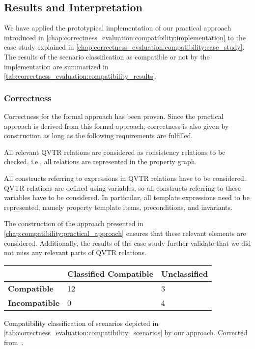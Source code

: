 \subsection{Results and Interpretation}

We have applied the prototypical implementation of our practical approach introduced in \autoref{chap:correctness_evaluation:compatibility:implementation} to the case study explained in \autoref{chap:correctness_evaluation:compatibility:case_study}.
The results of the scenario classification as compatible or not by the implementation are summarized in \autoref{tab:correctness_evaluation:compatibility_results}.

\subsubsection{Correctness}

Correctness for the formal approach has been proven.
Since the practical approach is derived from this formal approach, correctness is also given by construction as long as the following requirements are fulfilled.
\begin{longenumerate}
    \item All relevant \gls{QVTR} relations are considered as consistency relations to be checked, i.e., all relations are represented in the property graph.
    \item All constructs referring to expressions in \gls{QVTR} relations have to be considered. \gls{QVTR} relations are defined using variables, so all constructs referring to these variables have to be considered. In particular, all template expressions need to be represented, namely property template items, preconditions, and invariants.
\end{longenumerate}
The construction of the approach presented in \autoref{chap:compatibility:practical_approach} ensures that these relevant elements are considered.
Additionally, the results of the case study further validate that we did not miss any relevant parts of \gls{QVTR} relations.

\begin{propertable}
    \renewcommand{\arraystretch}{1.2}%
    \begin{tabular}{L{7em} C{10em} C{6em}}
        \toprule
         & \textbf{Classified Compatible} & \textbf{Unclassified} \\
         \midrule
         \textbf{Compatible} & 12 & 3\\
         \textbf{Incompatible} & 0 & 4\\
         \bottomrule
    \end{tabular}
    \caption[Correctness of compatibility classification results]{Compatibility classification of scenarios depicted in \autoref{tab:correctness_evaluation:compatibility_scenarios} by our approach. Corrected from~.}
    \label{tab:correctness_evaluation:compatibility_results}
\end{propertable}

